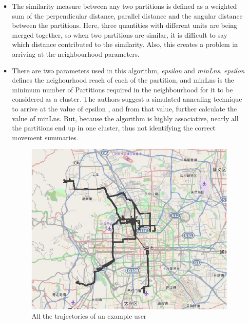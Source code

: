 \begin{itemize}

\item
The similarity measure between any two partitions is defined as a weighted sum of the perpendicular distance, parallel distance and the angular distance between the partitions. Here, three quantities with different units are being merged together, so when two partitions are similar, it is difficult to say which distance contributed to the similarity. Also, this creates a problem in arriving at the neighbourhood parameters. 

\item
 There are two parameters used in this algorithm, \textit{epsilon} and \textit{minLns}. \textit{epsilon} defines the neighourhood reach of each of the partition, and minLns is the minimum number of Partitions required in the neighbourhood for it to be considered as a cluster. The authors suggest a simulated annealing technique to arrive at the value of epsilon , and from that value, further calculate the value of minLns. But, because the algorithm is highly associative, nearly all the partitions end up in one cluster, thus not identifying the correct movement summaries. 
   
\begin{figure}
\centering     
\includegraphics[scale=0.3]{figs/TrajClus_full.jpg}
\caption{All the trajectories of an example user }
\label{fig:TrajClus_full}  
\end{figure}


\end{itemize}
